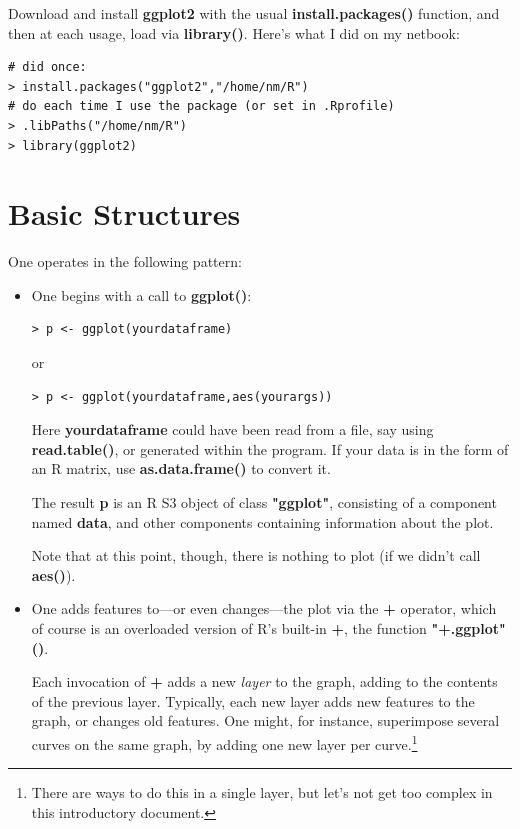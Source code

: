 Download and install {\bf ggplot2} with the usual {\bf
install.packages()} function, and then at each usage, load via {\bf
library()}.  Here's what I did on my netbook:

\begin{lstlisting}
# did once:
> install.packages("ggplot2","/home/nm/R")
# do each time I use the package (or set in .Rprofile)
> .libPaths("/home/nm/R")
> library(ggplot2)
\end{lstlisting}

\section{Basic Structures}

One operates in the following pattern:

\begin{itemize}

\item One begins with a call to {\bf ggplot()}: 

\begin{lstlisting}
> p <- ggplot(yourdataframe)
\end{lstlisting}

or 

\begin{lstlisting}
> p <- ggplot(yourdataframe,aes(yourargs))
\end{lstlisting}

Here {\bf yourdataframe} could have been read from a file, say using
{\bf read.table()}, or generated within the program.  If your data is in
the form of an R matrix, use {\bf as.data.frame()} to convert it.

The result {\bf p} is an R S3 object of class {\bf "ggplot"}, consisting
of a component named {\bf data}, and other components containing
information about the plot.  

Note that at this point, though, there is nothing to plot (if we didn't
call {\bf aes()}).

\item One adds features to---or even changes---the plot via the {\bf +}
operator, which of course is an overloaded version of R's built-in {\bf
+}, the function {\bf "+.ggplot"()}.  

Each invocation of {\bf +} adds a new {\it layer} to the graph, adding
to the contents of the previous layer.  Typically, each new layer adds
new features to the graph, or changes old features.  One might, for
instance, superimpose several curves on the same graph, by adding one
new layer per curve.\footnote{There are ways to do this in a single
layer, but let's not get too complex in this introductory document.}


\end{itemize}
